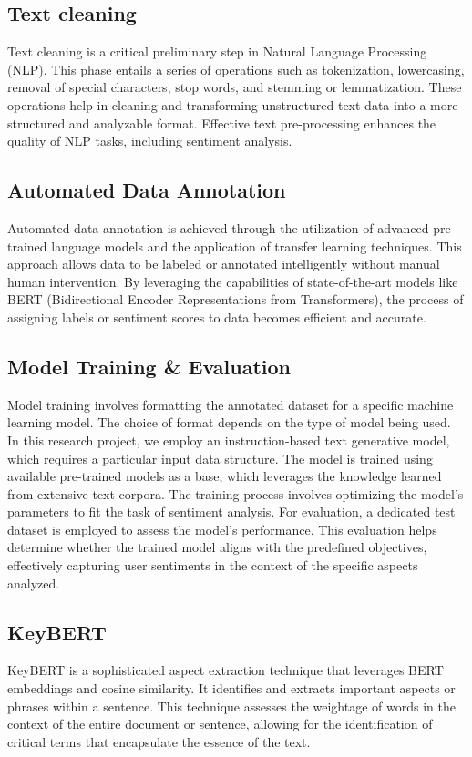 \subsection{Text cleaning}
Text cleaning is a critical preliminary step in Natural Language Processing (NLP). This phase entails a series of operations such as tokenization, lowercasing, removal of special characters, stop words, and stemming or lemmatization. These operations help in cleaning and transforming unstructured text data into a more structured and analyzable format. Effective text pre-processing enhances the quality of NLP tasks, including sentiment analysis.
\subsection{Automated Data Annotation}
Automated data annotation is achieved through the utilization of advanced pre-trained language models and the application of transfer learning techniques. This approach allows data to be labeled or annotated intelligently without manual human intervention. By leveraging the capabilities of state-of-the-art models like BERT (Bidirectional Encoder Representations from Transformers), the process of assigning labels or sentiment scores to data becomes efficient and accurate.
\subsection{Model Training & Evaluation}
Model training involves formatting the annotated dataset for a specific machine learning model. The choice of format depends on the type of model being used. In this research project, we employ an instruction-based text generative model, which requires a particular input data structure. The model is trained using available pre-trained models as a base, which leverages the knowledge learned from extensive text corpora. The training process involves optimizing the model's parameters to fit the task of sentiment analysis. For evaluation, a dedicated test dataset is employed to assess the model's performance. This evaluation helps determine whether the trained model aligns with the predefined objectives, effectively capturing user sentiments in the context of the specific aspects analyzed.
\subsection{KeyBERT}
KeyBERT is a sophisticated aspect extraction technique that leverages BERT embeddings and cosine similarity. It identifies and extracts important aspects or phrases within a sentence. This technique assesses the weightage of words in the context of the entire document or sentence, allowing for the identification of critical terms that encapsulate the essence of the text.
\clearpage
